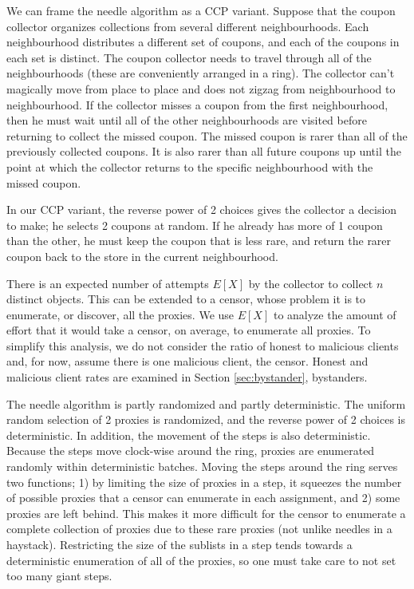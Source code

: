 We can frame the needle algorithm as a CCP variant. Suppose that the coupon collector organizes collections from several different neighbourhoods. Each neighbourhood distributes a different set of coupons, and each of the coupons in each set is distinct. The coupon collector needs to travel through all of the neighbourhoods (these are conveniently arranged in a ring). The collector can't magically move from place to place and does not zigzag from neighbourhood to neighbourhood. If the collector misses a coupon from the first neighbourhood, then he must wait until all of the other neighbourhoods are visited before returning to collect the missed coupon. The missed coupon is rarer than all of the previously collected coupons. It is also rarer than all future coupons up until the point at which the collector returns to the specific neighbourhood with the missed coupon.

In our CCP variant, the reverse power of 2 choices gives the collector a decision to make; he selects 2 coupons at random. If he already has more of 1 coupon than the other, he must keep the coupon that is less rare, and return the rarer coupon back to the store in the current neighbourhood. 

There is an expected number of attempts $E[X]$ by the collector to collect $n$ distinct objects. This can be extended to a censor, whose problem it is to enumerate, or discover, all the proxies. We use $E[X]$ to analyze the amount of effort that it would take a censor, on average, to enumerate all proxies. To simplify this analysis, we do not consider the ratio of honest to malicious clients and, for now, assume there is one malicious client, the censor. Honest and malicious client rates are examined in Section \ref{sec:bystander}, bystanders.

The needle algorithm is partly randomized and partly deterministic. The uniform random selection of 2 proxies is randomized, and the reverse power of 2 choices is deterministic. In addition, the movement of the steps is also deterministic. Because the steps move clock-wise around the ring, proxies are enumerated randomly within deterministic batches. Moving the steps around the ring serves two functions; 1) by limiting the size of proxies in a step, it squeezes the number of possible proxies that a censor can enumerate in each assignment, and 2) some proxies are left behind. This makes it more difficult for the censor to enumerate a complete collection of proxies due to these rare proxies (not unlike needles in a haystack). Restricting the size of the sublists in a step tends towards a deterministic enumeration of all of the proxies, so one must take care to not set too many giant steps. 

